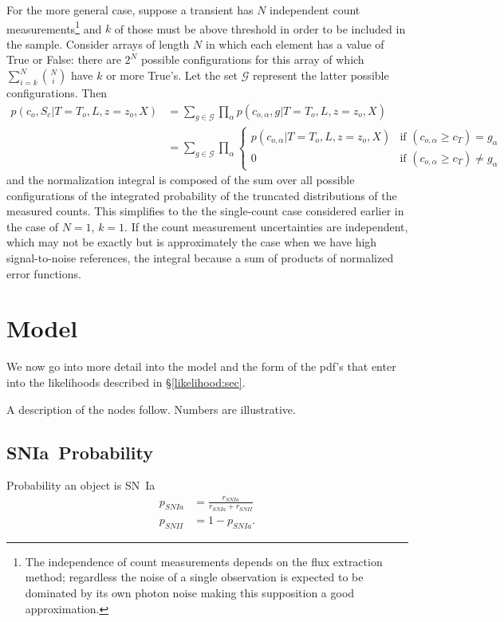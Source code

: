 \documentclass[preprint,3p]{elsarticle}
\begin{document}
For the more general case, suppose a transient has $N$ independent count measurements\footnote{The independence of count measurements  depends on the flux extraction method; regardless the
noise of a single observation is expected to be dominated by its own photon noise making this
supposition a good approximation.} and $k$ of those must be above threshold in order to be
included in the sample.
Consider arrays of length $N$ in which each element has a value of True or False: there are $2^N$ possible configurations for this array
of which $\sum_{i=k}^N {N \choose i}$ have $k$ or more True's.  Let the set $\mathcal{G}$ represent the latter possible configurations.
Then
\begin{align}
p(c_o, S_c| T=T_o, L, z=z_o, X) &= \sum_{g \in \mathcal{G}} \prod_{\alpha} p(c_{o, \alpha}, g | T=T_o, L, z=z_o, X)\\
 &=  \sum_{g \in \mathcal{G}}  \prod_{\alpha} \begin{cases}
   p(c_{o,\alpha} | T=T_o, L, z=z_o, X) & \text{if } (c_{o,\alpha} \ge c_T) = g_\alpha\\
   0 & \text{if }  (c_{o,\alpha} \ge c_T)  \ne g_\alpha
 \end{cases}
\end{align}
and the normalization integral is composed of the sum over all possible configurations of the integrated probability of the truncated distributions
of the measured counts.  This simplifies to the the single-count case considered earlier in the case of $N=1$, $k=1$.
If the count measurement uncertainties are independent, which may not be exactly but is approximately the case when we have high
signal-to-noise references, the integral because a sum of products of normalized error functions.



\section{Model}
\label{model:sec}

We now go into more detail into the model and the form of the pdf's that enter
into the likelihoods described in \S\ref{likelihood:sec}.

A description of the nodes follow.  Numbers are illustrative. 


\subsection{SNIa~Probability}
Probability an object is SN~Ia
\begin{align}
p_{SNIa} &= \frac{r_{SNIa}}{r_{SNIa}+r_{SNII}} \nonumber \\
p_{SNII}&=1-p_{SNIa}.
\label{prob:eqn}
\end{align}
\end{document}
